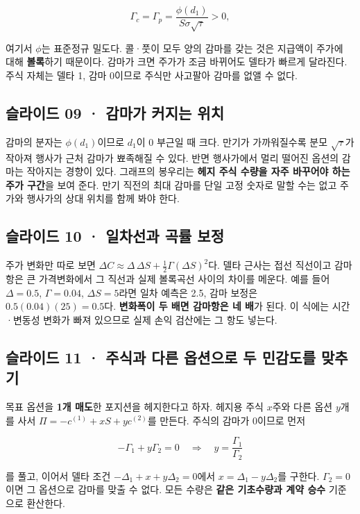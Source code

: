 \documentclass[11pt,a4paper]{article}
\begin{document}
\[
\Gamma_c=\Gamma_p=\frac{\phi(d_1)}{S\sigma\sqrt\tau}>0,
\]

여기서 $\phi$는 표준정규 밀도다. 콜·풋이 모두 양의 감마를 갖는 것은 지급액이 주가에 대해 \textbf{볼록}하기 때문이다. 감마가 크면 주가가 조금 바뀌어도 델타가 빠르게 달라진다. 주식 자체는 델타 1, 감마 0이므로 주식만 사고팔아 감마를 없앨 수 없다.\par

\subsection{슬라이드 09 · 감마가 커지는 위치}
감마의 분자는 $\phi(d_1)$이므로 $d_1$이 0 부근일 때 크다. 만기가 가까워질수록 분모 $\sqrt\tau$가 작아져 행사가 근처 감마가 뾰족해질 수 있다. 반면 행사가에서 멀리 떨어진 옵션의 감마는 작아지는 경향이 있다. 그래프의 봉우리는 \textbf{헤지 주식 수량을 자주 바꾸어야 하는 주가 구간}을 보여 준다. 만기 직전의 최대 감마를 단일 고정 숫자로 말할 수는 없고 주가와 행사가의 상대 위치를 함께 봐야 한다.\par

\subsection{슬라이드 10 · 일차선과 곡률 보정}
주가 변화만 따로 보면 $\Delta C\approx\Delta\,\Delta S+\frac12\Gamma(\Delta S)^2$다. 델타 근사는 접선 직선이고 감마항은 큰 가격변화에서 그 직선과 실제 볼록곡선 사이의 차이를 메운다. 예를 들어 $\Delta=0.5$, $\Gamma=0.04$, $\Delta S=5$라면 일차 예측은 2.5, 감마 보정은 $0.5(0.04)(25)=0.5$다. \textbf{변화폭이 두 배면 감마항은 네 배}가 된다. 이 식에는 시간·변동성 변화가 빠져 있으므로 실제 손익 검산에는 그 항도 넣는다.\par

\subsection{슬라이드 11 · 주식과 다른 옵션으로 두 민감도를 맞추기}
목표 옵션을 \textbf{1개 매도}한 포지션을 헤지한다고 하자. 헤지용 주식 $x$주와 다른 옵션 $y$개를 사서 $\Pi=-c^{(1)}+xS+yc^{(2)}$를 만든다. 주식의 감마가 0이므로 먼저\par

\[
-\Gamma_1+y\Gamma_2=0
\quad\Longrightarrow\quad y=\frac{\Gamma_1}{\Gamma_2}
\]

를 풀고, 이어서 델타 조건 $-\Delta_1+x+y\Delta_2=0$에서 $x=\Delta_1-y\Delta_2$를 구한다. $\Gamma_2=0$이면 그 옵션으로 감마를 맞출 수 없다. 모든 수량은 \textbf{같은 기초수량과 계약 승수} 기준으로 환산한다.\par
\end{document}

